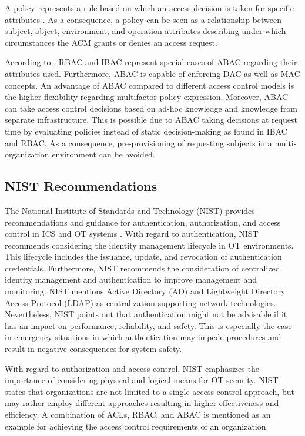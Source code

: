 A policy represents a rule based on which an access decision is taken for specific attributes \cite{Hu2014}.
As a consequence, a policy can be seen as a relationship between subject, object, environment, and operation attributes describing under which circumstances the ACM grants or denies an access request.

According to \citeauthor{Hu2014} \cite{Hu2014}, RBAC and IBAC represent special cases of ABAC regarding their attributes used.
Furthermore, ABAC is capable of enforcing DAC as well as MAC concepts.
An advantage of ABAC compared to different access control models is the higher flexibility regarding multifactor policy expression.
Moreover, ABAC can take access control decisions based on ad-hoc knowledge and knowledge from separate infrastructure.
This is possible due to ABAC taking decisions at request time by evaluating policies instead of static decision-making as found in IBAC and RBAC.
As a consequence, pre-provisioning of requesting subjects in a multi-organization environment can be avoided.

\subsection{NIST Recommendations}
The National Institute of Standards and Technology (NIST) provides recommendations and guidance for authentication, authorization, and access control in ICS \cite{Stouffer2015} and OT systems \cite{Stouffer2023}.
With regard to authentication, NIST recommends considering the identity management lifecycle in OT environments.
This lifecycle includes the issuance, update, and revocation of authentication credentials.
Furthermore, NIST recommends the consideration of centralized identity management and authentication to improve management and monitoring.
NIST mentions Active Directory (AD) and Lightweight Directory Access Protocol (LDAP) as centralization supporting network technologies.
Nevertheless, NIST points out that authentication might not be advisable if it has an impact on performance, reliability, and safety.
This is especially the case in emergency situations in which authentication may impede procedures and result in negative consequences for system safety.

With regard to authorization and access control, NIST emphasizes the importance of considering physical and logical means for OT security.
NIST states that organizations are not limited to a single access control approach, but may rather employ different approaches resulting in higher effectiveness and efficiency.
A combination of ACLs, RBAC, and ABAC is mentioned as an example for achieving the access control requirements of an organization.

